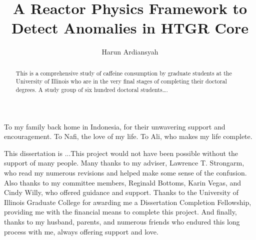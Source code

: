 \documentclass{uiucthesis2021}
\begin{document}
\title{A Reactor Physics Framework to Detect Anomalies in HTGR Core}
\author{Harun Ardiansyah}
\phdthesis
{}
\maketitle

\frontmatter

\begin{abstract}
This is a comprehensive study of caffeine consumption by graduate
students at the University of Illinois who are in the very final
stages of completing their doctoral degrees. A study group of six
hundred doctoral students\ldots.
\end{abstract}

\begin{dedication}
To my family back home in Indonesia, for their unwavering support and encouragement. To Nafi, the love of my life. To Ali, who makes my life complete.
\end{dedication}

\begin{acknowledgments}
This dissertation is ...This project would not have been possible without the support of
many people. Many thanks to my adviser, Lawrence T. Strongarm, who
read my numerous revisions and helped make some sense of the
confusion. Also thanks to my committee members, Reginald Bottoms,
Karin Vegas, and Cindy Willy, who offered guidance and support.
Thanks to the University of Illinois Graduate College for awarding
me a Dissertation Completion Fellowship, providing me with the
financial means to complete this project. And finally, thanks to
my husband, parents, and numerous friends who endured this long
process with me, always offering support and love.
\end{acknowledgments}

{
    \hypersetup{linkcolor=black}  %
    \tableofcontents
}
\end{document}
